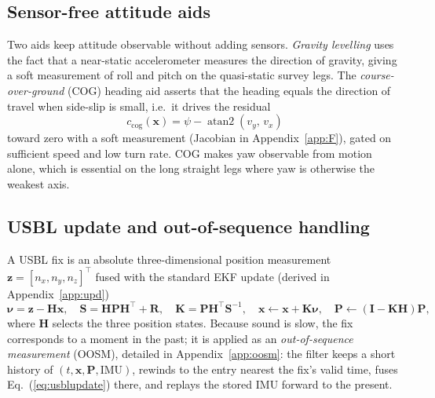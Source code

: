 \documentclass[12pt,a4paper,oneside]{book}
\newcommand{\eqnref}[1]{Eq.~(\ref{#1})}
\begin{document}
\subsection{Sensor-free attitude aids}
Two aids keep attitude observable without adding sensors. \emph{Gravity levelling} uses the fact that a
near-static accelerometer measures the direction of gravity, giving a soft measurement of roll and pitch on
the quasi-static survey legs. The \emph{course-over-ground} (COG) heading aid asserts that the heading
equals the direction of travel when side-slip is small, i.e.\ it drives the residual
\begin{equation}
c_{\text{cog}}(\mathbf{x}) = \psi - \operatorname{atan2}(v_y,\,v_x)
\label{eq:cog}
\end{equation}
toward zero with a soft measurement (Jacobian in Appendix~\ref{app:F}), gated on sufficient speed and low
turn rate. COG makes yaw observable from motion alone, which is essential on the long straight legs where
yaw is otherwise the weakest axis.

\subsection{USBL update and out-of-sequence handling}
A USBL fix is an absolute three-dimensional position measurement $\mathbf{z}=[n_x,n_y,n_z]^{\top}$ fused
with the standard EKF update (derived in Appendix~\ref{app:upd})
\begin{equation}
\boldsymbol{\nu}=\mathbf{z}-\mathbf{H}\mathbf{x},\quad
\mathbf{S}=\mathbf{H}\mathbf{P}\mathbf{H}^{\!\top}+\mathbf{R},\quad
\mathbf{K}=\mathbf{P}\mathbf{H}^{\!\top}\mathbf{S}^{-1},\quad
\mathbf{x}\leftarrow\mathbf{x}+\mathbf{K}\boldsymbol{\nu},\quad
\mathbf{P}\leftarrow(\mathbf{I}-\mathbf{K}\mathbf{H})\mathbf{P},
\label{eq:usblupdate}
\end{equation}
where $\mathbf{H}$ selects the three position states. Because sound is slow, the fix corresponds to a moment
in the past; it is applied as an \emph{out-of-sequence measurement} (OOSM), detailed in
Appendix~\ref{app:oosm}: the filter keeps a short history of $(t,\mathbf{x},\mathbf{P},\text{IMU})$, rewinds
to the entry nearest the fix's valid time, fuses \eqnref{eq:usblupdate} there, and replays the stored IMU
forward to the present.
\end{document}
